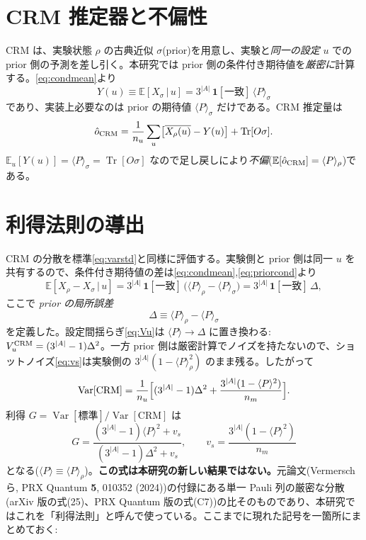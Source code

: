 \documentclass[11pt,a4paper]{ltjsarticle}
\newcommand{\ev}[1]{\langle #1\rangle}
\newcommand{\Tr}{\operatorname{Tr}}
\newcommand{\Var}{\operatorname{Var}}
\begin{document}
\section{CRM 推定器と不偏性}
\label{sec:crmest}

CRM は、実験状態 $\rho$ の古典近似 $\sigma$(prior)を用意し、実験と\emph{同一の設定} $u$ での prior 側の予測を差し引く。本研究では prior 側の条件付き期待値を\emph{厳密に}計算する。\eqref{eq:condmean}より
\begin{equation}
  Y(u)\equiv\mathbb E[X_\sigma\,|\,u] = 3^{|A|}\,\mathbf 1[\text{一致}]\,\ev{P}_\sigma
  \label{eq:priorcond}
\end{equation}
であり、実装上必要なのは prior の期待値 $\ev{P}_\sigma$ だけである。CRM 推定量は
\begin{equation}
  \hat o_{\rm CRM} = \frac{1}{n_u}\sum_u\bigl[\overline{X_\rho(u)}-Y(u)\bigr] + \Tr[O\sigma].
\end{equation}
$\mathbb E_u[Y(u)]=\ev{P}_\sigma=\Tr[O\sigma]$ なので足し戻しにより\emph{不偏}($\mathbb E[\hat o_{\rm CRM}]=\ev{P}_\rho$)である。

\section{利得法則の導出}
\label{sec:gainderive}

CRM の分散を標準\eqref{eq:varstd}と同様に評価する。実験側と prior 側は同一 $u$ を共有するので、条件付き期待値の差は\eqref{eq:condmean},\eqref{eq:priorcond}より
\begin{equation}
  \mathbb E[X_\rho-X_\sigma\,|\,u] = 3^{|A|}\,\mathbf 1[\text{一致}]\,\bigl(\ev{P}_\rho-\ev{P}_\sigma\bigr)
  = 3^{|A|}\,\mathbf 1[\text{一致}]\,\Delta,
\end{equation}
ここで \emph{prior の局所誤差}
\begin{equation}
  \boxed{\ \Delta \equiv \ev{P}_\rho - \ev{P}_\sigma\ }
\end{equation}
を定義した。設定間揺らぎ\eqref{eq:Vu}は $\ev{P}\to\Delta$ に置き換わる:$V_u^{\rm CRM}=(3^{|A|}-1)\Delta^2$。一方 prior 側は厳密計算でノイズを持たないので、ショットノイズ\eqref{eq:vs}は実験側の $3^{|A|}(1-\ev{P}_\rho^2)$ のまま残る。したがって
\begin{equation}
  \Var[\text{CRM}] = \frac{1}{n_u}\Bigl[(3^{|A|}-1)\Delta^2 + \frac{3^{|A|}(1-\ev{P}^2)}{n_m}\Bigr].
\end{equation}
利得 $G=\Var[\text{標準}]/\Var[\text{CRM}]$ は
\begin{equation}
  \boxed{\;G = \frac{(3^{|A|}-1)\ev{P}^2 + v_s}{(3^{|A|}-1)\Delta^2 + v_s},\qquad v_s=\frac{3^{|A|}(1-\ev{P}^2)}{n_m}\;}
  \label{eq:gain-t}
\end{equation}
となる($\ev{P}\equiv\ev{P}_\rho$)。\textbf{この式は本研究の新しい結果ではない。}元論文(Vermersch ら, PRX Quantum \textbf{5}, 010352 (2024))の付録にある単一 Pauli 列の厳密な分散(arXiv 版の式(25)、PRX Quantum 版の式(C7))の比そのものであり、本研究ではこれを「利得法則」と呼んで使っている。ここまでに現れた記号を一箇所にまとめておく:
\end{document}
